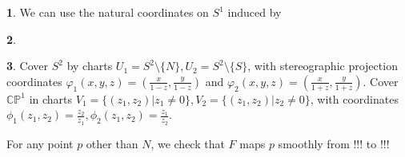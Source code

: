 \documentclass[10.5pt]{article}
\theoremstyle{definition}
\newtheorem{pb}{}
\newcommand{\set}[1]{\{#1\}}
\begin{document}
    \begin{pb}
        We can use the natural coordinates on \(S^1\) induced by
    \end{pb}
    \begin{pb}
        
    \end{pb}
    \begin{pb}
        Cover \(S^2\) by charts \(U_1 = S^2 \setminus \set{N}, U_2 = S^2 \setminus \set{S}\), with stereographic projection coordinates
        \(\varphi_1(x,y,z) = (\frac{x}{1-z},\frac{y}{1-z})\) and \(\varphi_2(x,y,z) = (\frac{x}{1+z},\frac{y}{1+z})\).
        Cover \(\mathbb{CP}^1\) in charts \(V_1 = \set{(z_1,z_2)\vert z_1 \neq 0}, V_2 = \set{(z_1,z_2)\vert z_2 \neq 0}\), with coordinates
        \(\phi_1(z_1,z_2) = \frac{z_2}{z_1}, \phi_2(z_1,z_2) = \frac{z_1}{z_2}\).

        For any point \(p\) other than \(N\), we check that \(F\) maps \(p\) smoothly from !!! to !!!
    \end{pb}
\end{document}
